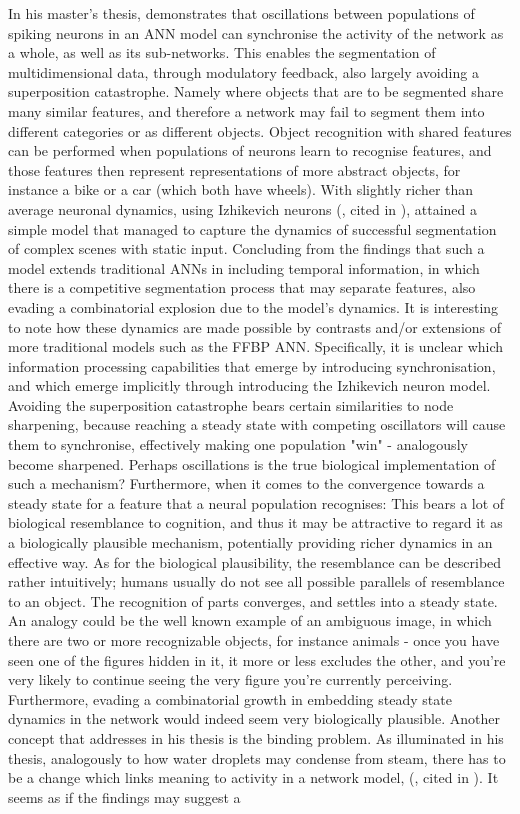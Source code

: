 In his master's thesis, \cite{Solbakken2009} demonstrates that oscillations between populations of spiking neurons in an ANN model can synchronise the activity of the network as a whole, as well as its sub-networks. This enables the segmentation of multidimensional data, through modulatory feedback, also largely avoiding a superposition catastrophe. Namely where objects that are to be segmented share many similar features, and therefore a network may fail to segment them into different categories or as different objects. Object recognition with shared features can be performed when populations of neurons learn to recognise features, and those features then represent representations of more abstract objects, for instance a bike or a car (which both have wheels). With slightly richer than average neuronal dynamics, using Izhikevich neurons (\cite{Izhikevich2003}, cited in \cite{Solbakken2009}), \cite{Solbakken2009} attained a simple model that managed to capture the dynamics of successful segmentation of complex scenes with static input. Concluding from the findings that such a model extends traditional ANNs in including temporal information, in which there is a competitive segmentation process that may separate features, also evading a combinatorial explosion due to the model's dynamics. It is interesting to note how these dynamics are made possible by contrasts and/or extensions of more traditional models such as the FFBP ANN. Specifically, it is unclear which information processing capabilities that emerge by introducing synchronisation, and which emerge implicitly through introducing the Izhikevich neuron model. Avoiding the superposition catastrophe bears certain similarities to node sharpening, because reaching a steady state with competing oscillators will cause them to synchronise, effectively making one population "win" - analogously become sharpened. Perhaps oscillations is the true biological implementation of such a mechanism? Furthermore, when it comes to the convergence towards a steady state for a feature that a neural population recognises: This bears a lot of biological resemblance to cognition, and thus it may be attractive to regard it as a biologically plausible mechanism, potentially providing richer dynamics in an effective way. As for the biological plausibility, the resemblance can be described rather intuitively; humans usually do not see all possible parallels of resemblance to an object. The recognition of parts converges, and settles into a steady state. An analogy could be the well known example of an ambiguous image, in which there are two or more recognizable objects, for instance animals - once you have seen one of the figures hidden in it, it more or less excludes the other, and you're very likely to continue seeing the very figure you're currently perceiving. Furthermore, evading a combinatorial growth in embedding steady state dynamics in the network would indeed seem very biologically plausible. Another concept that \cite{Solbakken2009} addresses in his thesis is the binding problem. As illuminated in his thesis, analogously to how water droplets may condense from steam,  there has to be a change which links meaning to activity in a network model, (\cite{Freeman2003}, cited in \cite{Solbakken2009}). It seems as if the findings may suggest a 